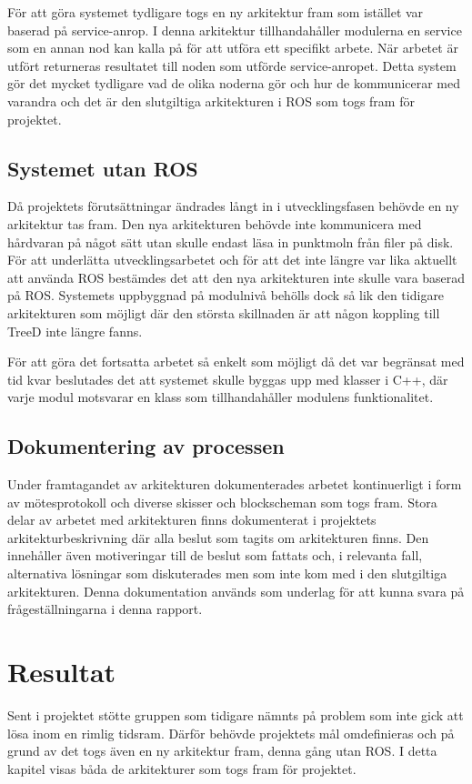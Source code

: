 För att göra systemet tydligare togs en ny arkitektur fram som istället var baserad på service-anrop. I denna arkitektur tillhandahåller modulerna en service som en annan nod kan kalla på för att utföra ett specifikt arbete. När arbetet är utfört returneras resultatet till noden som utförde service-anropet. Detta system gör det mycket tydligare vad de olika noderna gör och hur de kommunicerar med varandra och det är den slutgiltiga arkitekturen i ROS som togs fram för projektet.

\subsection{Systemet utan ROS}
Då projektets förutsättningar ändrades långt in i utvecklingsfasen behövde en ny arkitektur tas fram. Den nya arkitekturen behövde inte kommunicera med hårdvaran på något sätt utan skulle endast läsa in punktmoln från filer på disk. För att underlätta utvecklingsarbetet och för att det inte längre var lika aktuellt att använda ROS bestämdes det att den nya arkitekturen inte skulle vara baserad på ROS. Systemets uppbyggnad på modulnivå behölls dock så lik den tidigare arkitekturen som möjligt där den största skillnaden är att någon koppling till TreeD inte längre fanns.

För att göra det fortsatta arbetet så enkelt som möjligt då det var begränsat med tid kvar beslutades det att systemet skulle byggas upp med klasser i C++, där varje modul motsvarar en klass som tillhandahåller modulens funktionalitet.

\subsection{Dokumentering av processen}
Under framtagandet av arkitekturen dokumenterades arbetet kontinuerligt i form av mötes\-protokoll och diverse skisser och blockscheman som togs fram. Stora delar av arbetet med arkitekturen finns dokumenterat i projektets arkitekturbeskrivning där alla beslut som tagits om arkitekturen finns. Den innehåller även motiveringar till de beslut som fattats och, i relevanta fall, alternativa lösningar som diskuterades men som inte kom med i den slutgiltiga arkitekturen. Denna dokumentation används som underlag för att kunna svara på frågeställningarna i denna rapport.


\section{Resultat}
\label{sec:results-lundberg}
Sent i projektet stötte gruppen som tidigare nämnts på problem som inte gick att lösa inom en rimlig tidsram. Därför behövde projektets mål omdefinieras och på grund av det togs även en ny arkitektur fram, denna gång utan ROS. I detta kapitel visas båda de arkitekturer som togs fram för projektet.

